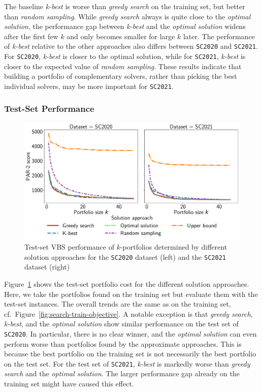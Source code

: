 \documentclass[a4paper,USenglish,pdfa]{lipics-v2021} %
\begin{document}
The baseline \emph{k-best} is worse than \emph{greedy search} on the training set, but better than \emph{random sampling}.
While \emph{greedy search} always is quite close to the \emph{optimal solution}, the performance gap between \emph{k-best} and the \emph{optimal solution} widens after the first few $k$ and only becomes smaller for large $k$ later.
The performance of \emph{k-best} relative to the other approaches also differs between \texttt{SC2020} and \texttt{SC2021}.
For \texttt{SC2020}, \emph{k-best} is closer to the optimal solution, while for \texttt{SC2021}, \emph{k-best} is closer to the expected value of \emph{random sampling}.
These results indicate that building a portfolio of complementary solvers, rather than picking the best individual solvers, may be more important for \texttt{SC2021}. 

\subsubsection{Test-Set Performance}

\begin{figure}[tb]
	\centering
	\includegraphics[width=\columnwidth, trim={0 15 0 0}, clip]{plots/search-test-objective.pdf}
	\caption{Test-set VBS performance of $k$-portfolios determined by different solution approaches for the \texttt{SC2020} dataset (left) and the \texttt{SC2021} dataset (right)}
	\label{fig:search-test-objective}
\end{figure}

Figure~\ref{fig:search-test-objective} shows the test-set portfolio cost for the different solution approaches.
Here, we take the portfolios found on the training set but evaluate them with the test-set instances.
The overall trends are the same as on the training set, cf.~Figure~\ref{fig:search-train-objective}.
A notable exception is that \emph{greedy search}, \emph{k-best}, and the \emph{optimal solution} show similar performance on the test set of \texttt{SC2020}.
In particular, there is no clear winner, and the \emph{optimal solution} can even perform worse than portfolios found by the approximate approaches. 
This is because the best portfolio on the training set is not necessarily the best portfolio on the test set.
For the test set of \texttt{SC2021}, \emph{k-best} is markedly worse than \emph{greedy search} and the \emph{optimal solution}. 
The larger performance gap already on the training set might have caused this effect.
\end{document}
